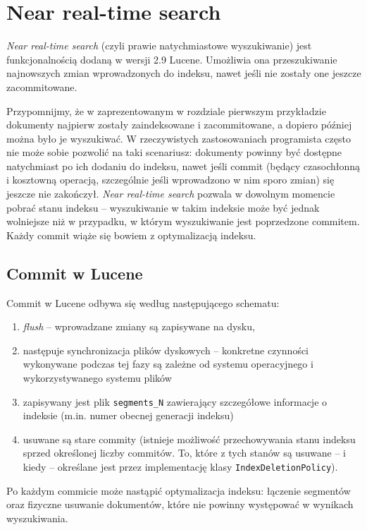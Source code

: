 \chapter{Near real-time search}

\emph{Near real-time search} (czyli prawie natychmiastowe wyszukiwanie) jest funkcjonalnością dodaną w wersji 2.9 Lucene. Umożliwia ona przeszukiwanie najnowszych zmian wprowadzonych do indeksu, nawet jeśli nie zostały one jeszcze zacommitowane. 

Przypomnijmy, że w zaprezentowanym w rozdziale pierwszym przykładzie dokumenty najpierw zostały zaindeksowane i zacommitowane, a dopiero później można było je wyszukiwać. W rzeczywistych zastosowaniach programista często nie może sobie pozwolić na taki scenariusz: dokumenty powinny być dostępne natychmiast po ich dodaniu do indeksu, nawet jeśli commit (będący czasochłonną i kosztowną operacją, szczególnie jeśli wprowadzono w nim sporo zmian) się jeszcze nie zakończył. \emph{Near real-time search} pozwala w dowolnym momencie pobrać stanu indeksu -- wyszukiwanie w takim indeksie może być jednak wolniejsze niż w przypadku, w którym wyszukiwanie jest poprzedzone commitem. Każdy commit wiąże się bowiem z optymalizacją indeksu.

\section{Commit w Lucene}

Commit w Lucene odbywa się według następującego schematu:
\begin{enumerate}
 \item \emph{flush} -- wprowadzane zmiany są zapisywane na dysku,
 \item następuje synchronizacja plików dyskowych -- konkretne czynności wykonywane podczas tej fazy są zależne od systemu operacyjnego i wykorzystywanego systemu plików
 \item zapisywany jest plik \texttt{segments\_N} zawierający szczegółowe informacje o indeksie (m.in. numer obecnej generacji indeksu)
 \item usuwane są stare commity (istnieje możliwość przechowywania stanu indeksu sprzed określonej liczby commitów. To, które z tych stanów są usuwane -- i kiedy -- określane jest przez implementację klasy \texttt{IndexDeletionPolicy}).
\end{enumerate}

Po każdym commicie może nastąpić optymalizacja indeksu: łączenie segmentów oraz fizyczne usuwanie dokumentów, które nie powinny występować w wynikach wyszukiwania.


